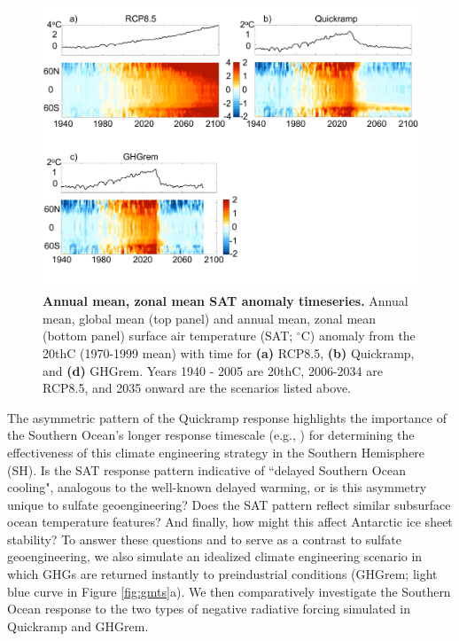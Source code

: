 \documentclass[grl]{AGUTeX}  %
\begin{document}
\begin{article}
\begin{figure}[htbp] %
\centering
 \noindent\includegraphics[width=39pc]{figures/SATlatbytime.pdf}
\caption{\textbf{Annual mean, zonal mean SAT anomaly timeseries.} Annual mean, global mean (top panel) and annual mean, zonal mean (bottom panel) surface air temperature (SAT; $^\circ$C) anomaly from the 20thC (1970-1999 mean) with time for \textbf{(a)} RCP8.5, \textbf{(b)} Quickramp, and \textbf{(d)} GHGrem. Years 1940 - 2005 are 20thC, 2006-2034 are RCP8.5, and 2035 onward are the scenarios listed above.}
\label{fig:satlattime}
\end{figure}

The asymmetric pattern of the Quickramp response highlights the importance of the Southern Ocean's longer response timescale (e.g., \cite{manabe1991,stouffer04,yang11}) for determining the effectiveness of this climate engineering strategy in the Southern Hemisphere (SH). Is the SAT response pattern indicative of ``delayed Southern Ocean cooling", analogous to the well-known delayed warming, or is this asymmetry unique to sulfate geoengineering? Does the SAT pattern reflect similar subsurface ocean temperature features? And finally, how might this affect Antarctic ice sheet stability? To answer these questions and to serve as a contrast to sulfate geoengineering, we also simulate an idealized climate engineering scenario in which GHGs are returned instantly to preindustrial conditions (GHGrem; light blue curve in Figure \ref{fig:gmts}a). We then comparatively investigate the Southern Ocean response to the two types of negative radiative forcing simulated in Quickramp and GHGrem. %


\end{article}
\end{document}
